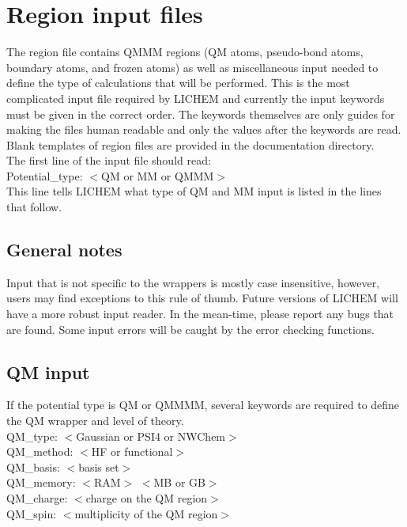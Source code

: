 \documentclass[12pt]{report}
\begin{document}
\section{Region input files}

The region file contains QMMM regions (QM atoms, pseudo-bond atoms, boundary
atoms, and frozen atoms) as well as miscellaneous input needed to define the
type of calculations that will be performed.
This is the most complicated input file required by LICHEM and currently the
input keywords must be given in the correct order.
The keywords themselves are only guides for making the files human readable
and only the values after the keywords are read.
Blank templates of region files are provided in the documentation
directory. \\

The first line of the input file should read: \\

Potential\_type: $<$QM or MM or QMMM$>$ \\

This line tells LICHEM what type of QM and MM input is listed in the lines
that follow.

\subsection{General notes}

Input that is not specific to the wrappers is mostly case insensitive,
however, users may find exceptions to this rule of thumb.
Future versions of LICHEM will have a more robust input reader.
In the mean-time, please report any bugs that are found.
Some input errors will be caught by the error checking functions.

\subsection{QM input}

If the potential type is QM or QMMMM, several keywords are required to define
the QM wrapper and level of theory. \\

QM\_type: $<$Gaussian or PSI4 or NWChem$>$ \\
QM\_method: $<$HF or functional$>$ \\
QM\_basis: $<$basis set$>$ \\
QM\_memory: $<$RAM$>$ $<$MB or GB$>$ \\
QM\_charge: $<$charge on the QM region$>$ \\
QM\_spin: $<$multiplicity of the QM region$>$ \\
\end{document}
